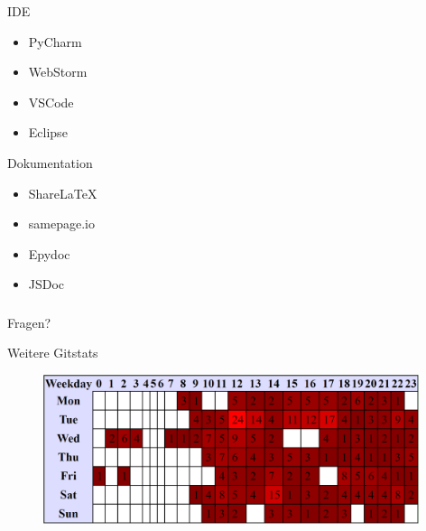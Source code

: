 \documentclass[11pt, usepdftitle=false,...]{beamer}
\begin{document}
	
	
	\begin{frame}{IDE}
	    \begin{itemize}
	        \item PyCharm
	        \item WebStorm
	        \item VSCode
	        \item Eclipse
	    \end{itemize}
	\end{frame}
	
	\begin{frame}{Dokumentation}
	    \begin{itemize}
	        \item ShareLaTeX
	        \item samepage.io
	        \item Epydoc
	        \item JSDoc
	    \end{itemize}
	\end{frame}
	    
	
	\begin{frame}
		\frametitle{}
		\centering
		\Huge Fragen?
	\end{frame}
	
	
	\begin{frame}{Weitere Gitstats}
	    \begin{figure}[ht] 
					\centering
					\includegraphics[width=11cm]{images/hours_of_week.PNG}
				\end{figure}
	\end{frame}
	
\end{document}
